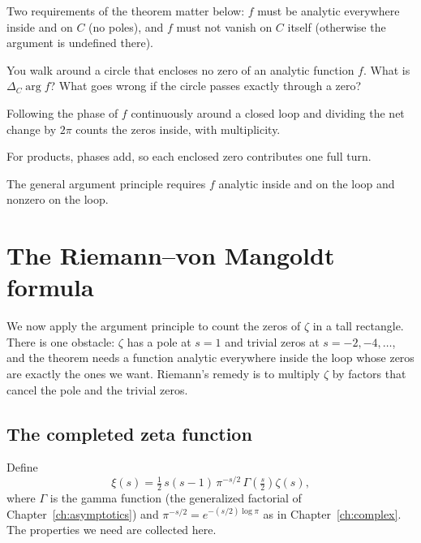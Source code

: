 Two requirements of the theorem matter below: $f$ must be analytic everywhere inside and on $C$ (no poles), and $f$ must not vanish on $C$ itself (otherwise the argument is undefined there).

\begin{checkpoint}
You walk around a circle that encloses no zero of an analytic function $f$. What is $\Delta_C\arg f$? What goes wrong if the circle passes exactly through a zero?
\end{checkpoint}

\begin{keyideas}
\item Following the phase of $f$ continuously around a closed loop and dividing the net change by $2\pi$ counts the zeros inside, with multiplicity.
\item For products, phases add, so each enclosed zero contributes one full turn.
\item The general argument principle requires $f$ analytic inside and on the loop and nonzero on the loop.
\end{keyideas}

\section{The Riemann--von Mangoldt formula}\label{sec:counting-zeros-rvm}

We now apply the argument principle to count the zeros of $\zeta$ in a tall rectangle. There is one obstacle: $\zeta$ has a pole at $s=1$ and trivial zeros at $s=-2,-4,\dots$, and the theorem needs a function analytic everywhere inside the loop whose zeros are exactly the ones we want. Riemann's remedy is to multiply $\zeta$ by factors that cancel the pole and the trivial zeros.

\subsection{The completed zeta function}

Define
\begin{equation}
\xi(s)=\tfrac12\,s(s-1)\,\pi^{-s/2}\,\Gamma\!\left(\tfrac s2\right)\zeta(s),
\label{eq:counting-zeros-xi}
\end{equation}
where $\Gamma$ is the gamma function (the generalized factorial of Chapter~\ref{ch:asymptotics}) and $\pi^{-s/2}=e^{-(s/2)\log\pi}$ as in Chapter~\ref{ch:complex}. The properties we need are collected here.

